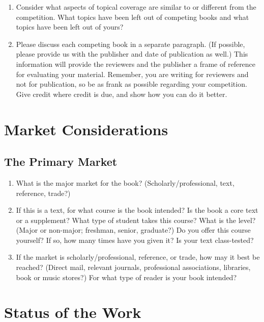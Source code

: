 \documentclass[
  10pt,
  dvipsnames,enabledeprecatedfontcommands]{scrartcl}
\begin{document}
\begin{enumerate}
\def\labelenumi{\alph{enumi}.}
\setcounter{enumi}{1}
\item
  Consider what aspects of topical coverage are similar to or different
  from the competition. What topics have been left out of competing
  books and what topics have been left out of yours?
\item
  Please discuss each competing book in a separate paragraph. (If
  possible, please provide us with the publisher and date of publication
  as well.) This information will provide the reviewers and the
  publisher a frame of reference for evaluating your material. Remember,
  you are writing for reviewers and not for publication, so be as frank
  as possible regarding your competition. Give credit where credit is
  due, and show how you can do it better.
\end{enumerate}

\hypertarget{market-considerations}{%
\section{Market Considerations}\label{market-considerations}}

\hypertarget{the-primary-market}{%
\subsection{The Primary Market}\label{the-primary-market}}

\begin{enumerate}
\def\labelenumi{\arabic{enumi}.}
\item
  What is the major market for the book? (Scholarly/professional, text,
  reference, trade?)
\item
  If this is a text, for what course is the book intended? Is the book a
  core text or a supplement? What type of student takes this course?
  What is the level? (Major or non-major; freshman, senior, graduate?)
  Do you offer this course yourself? If so, how many times have you
  given it? Is your text class-tested?
\item
  If the market is scholarly/professional, reference, or trade, how may
  it best be reached? (Direct mail, relevant journals, professional
  associations, libraries, book or music stores?) For what type of
  reader is your book intended?
\end{enumerate}

\hypertarget{status-of-the-work}{%
\section{Status of the Work}\label{status-of-the-work}}
\end{document}

